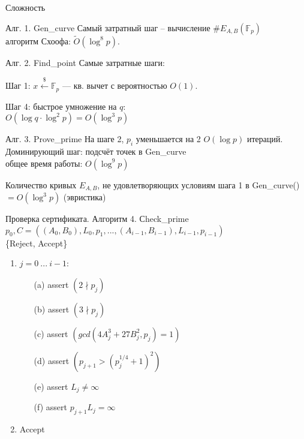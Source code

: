 \documentclass{beamer}
\begin{document}
\begin{frame}{Сложность}
\begin{block}{Алг. 1. Gen\_curve}
Самый затратный шаг -- вычисление $\#E_{A,B}(\mathbb{F}_p)$ \\\structure{$\implies$}
алгоритм Схоофа: $\widetilde{O}(\log^8 p)$.
\end{block}
\begin{block}{Алг. 2. Find\_point}
Самые затратные шаги:

Шаг 1: $x \xleftarrow{\$} \mathbb{F}_p$ — кв. вычет с вероятностью $O(1)$.

Шаг 4: быстрое умножение на $q$:\\$O(\log q \cdot \log^2 p) = O(\log^3 p)$
\end{block}

\begin{block}{Алг. 3. Prove\_prime}
На шаге 2, $p_i$ уменьшается на 2 \structure{$\implies$} $O(\log p)$ итераций.\\
Доминирующий шаг: подсчёт точек в Gen\_curve \\
\structure{$\implies$} общее время работы: $O(\log^9 p)$

Количество кривых $E_{A,B}$, не удовлетворяющих условиям шага 1 в Gen\_curve() $= O(\log^3 p)$ (эвристика)
\end{block}
\end{frame}

\begin{frame}{Проверка сертификата. Алгоритм 4. Сheck\_prime}
 $p_0, C =((A_0, B_0), L_0, p_1, ..., (A_{i-1}, B_{i-1}), L_{i-1}, p_{i-1})$\\
 \{Reject, Accept\}
\begin{enumerate}
    \item {} $j = 0\ ...\ i-1$:
    \begin{enumerate}
        \item[(a)] assert $(2 \nmid p_j)$
        \item[(b)] assert $(3 \nmid p_j)$
        \item[(c)] assert $(gcd(4A^3_j + 27B_j^2, p_j) = 1)$
        \item[(d)] assert $(p_{j+1} > (p_j^{1/4} + 1)^2)$
        \item[(e)] assert $L_j \neq \infty$
        \item[(f)] assert $p_{j+1}L_j = \infty$
    \end{enumerate}
    \item {} Accept
\end{enumerate}
\end{frame}
\end{document}
